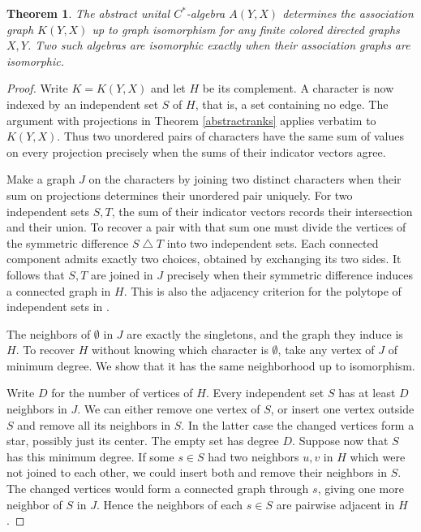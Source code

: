 \documentclass[11pt,a4paper]{article}
\newtheorem{thm}{Theorem}[section]
\begin{document}
\begin{thm}\label{abstractgraph}
The abstract unital $C^*$-algebra $A(Y,X)$ determines the association graph $K(Y,X)$ up to graph isomorphism for any finite colored directed graphs $X,Y$. Two such algebras are isomorphic exactly when their association graphs are isomorphic.
\end{thm}
\begin{proof}
Write $K=K(Y,X)$ and let $H$ be its complement. A character is now indexed by an independent set $S$ of $H$, that is, a set containing no edge. The argument with projections in Theorem \ref{abstractranks} applies verbatim to $K(Y,X)$. Thus two unordered pairs of characters have the same sum of values on every projection precisely when the sums of their indicator vectors agree.

Make a graph $J$ on the characters by joining two distinct characters when their sum on projections determines their unordered pair uniquely. For two independent sets $S,T$, the sum of their indicator vectors records their intersection and their union. To recover a pair with that sum one must divide the vertices of the symmetric difference $S\mathbin{\triangle}T$ into two independent sets. Each connected component admits exactly two choices, obtained by exchanging its two sides. It follows that $S,T$ are joined in $J$ precisely when their symmetric difference induces a connected graph in $H$. This is also the adjacency criterion for the polytope of independent sets in \cite{chvatal}.

The neighbors of $\emptyset$ in $J$ are exactly the singletons, and the graph they induce is $H$. To recover $H$ without knowing which character is $\emptyset$, take any vertex of $J$ of minimum degree. We show that it has the same neighborhood up to isomorphism.

Write $D$ for the number of vertices of $H$. Every independent set $S$ has at least $D$ neighbors in $J$. We can either remove one vertex of $S$, or insert one vertex outside $S$ and remove all its neighbors in $S$. In the latter case the changed vertices form a star, possibly just its center. The empty set has degree $D$. Suppose now that $S$ has this minimum degree. If some $s\in S$ had two neighbors $u,v$ in $H$ which were not joined to each other, we could insert both and remove their neighbors in $S$. The changed vertices would form a connected graph through $s$, giving one more neighbor of $S$ in $J$. Hence the neighbors of each $s\in S$ are pairwise adjacent in $H$.


\end{proof}
\end{document}
